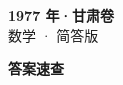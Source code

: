 \documentclass[zihao=-4, a4paper]{ctexart}
\begin{document}
\begin{center}
  {\Large\bfseries 1977 年·甘肃卷}\\[4pt]
  {\large 数学 · 简答版}
\end{center}
\medskip
{}

\clearpage
{}
\begin{center}{\Large\bfseries 答案速查}\end{center}
\medskip

\end{document}
